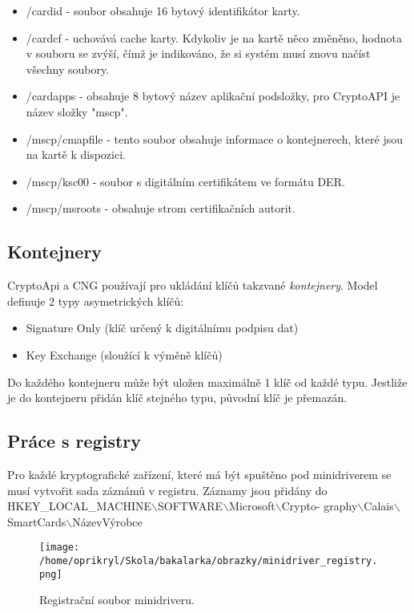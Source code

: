 \documentclass[]{fithesis3}
\begin{document}
		\begin{itemize}
			\item /cardid - soubor obsahuje 16 bytový identifikátor karty.
			\item /cardcf - uchovává cache karty. Kdykoliv je na kartě něco změněno, hodnota v 				souboru se zvýší, čímž je indikováno, že si systém musí znovu načíst všechny soubory.
			\item /cardapps - obsahuje 8 bytový název aplikační podsložky, pro CryptoAPI je název 			složky "mscp".
			\item /mscp/cmapfile - tento soubor obsahuje informace o kontejnerech, které jsou na 				kartě k dispozici.
			\item /mscp/ksc00 - soubor s digitálním certifikátem ve formátu DER.
			\item /mscp/msroots - obsahuje strom certifikačních autorit.
		\end{itemize}

		\subsection{Kontejnery}
		CryptoApi a CNG používají pro ukládání klíčů takzvané \textit{kontejnery}. Model definuje 			2 typy asymetrických klíčů:
		\begin{itemize}
			\item Signature Only (klíč určený k digitálnímu podpisu dat)
			\item  Key Exchange (sloužící k výměně klíčů)
		\end{itemize}		
		Do každého kontejneru může být uložen maximálně 1 klíč od každé typu. Jestliže je do 				kontejneru přidán klíč stejného typu, původní klíč je přemazán.

		\subsection{Práce s registry}
		
		Pro každé kryptografické zařízení, které má být spuštěno pod minidriverem se musí 				vytvořit sada záznámů v registru. Záznamy jsou přidány do HKEY\_LOCAL\_MACHINE$\backslash$SOFTWARE$\backslash$Microsoft$\backslash$Crypto- graphy$\backslash$Calais$\backslash$SmartCards$\backslash$NázevVýrobce

		\begin{figure}[!ht]
  			\begin{minipage}{1.00\textwidth}
    				\texttt{[image: /home/oprikryl/Skola/bakalarka/obrazky/minidriver\_registry.png]}
  			\end{minipage}
 			\caption{Registrační soubor minidriveru.}
  			\label{fig:Registrační soubor minidriveru.}
		\end{figure}	
\end{document}
